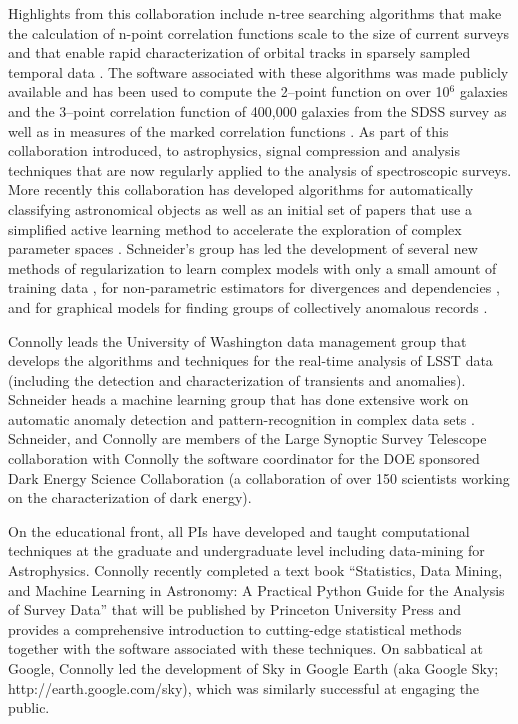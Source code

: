 \documentclass[useAMS,usenatbib,tightenlines,11pt,preprint]{aastex}
\begin{document}
Highlights from this collaboration include n-tree searching algorithms
that make the calculation of n-point correlation functions scale to
the size of current surveys \cite{GrayMoore} and that enable rapid
characterization of orbital tracks in sparsely sampled temporal data
\cite{kubica}. The software associated with these algorithms was made
publicly available and has been used to compute the 2--point function
on over 10$^6$ galaxies and the 3--point correlation function of
400,000 galaxies from the SDSS survey
\cite{Scranton2002,Szapudi2002,Nichol2006,mcbride2011a,mcbride2011b}
as well as in measures of the marked correlation functions
\cite{Skibba2006}.  As part of this collaboration \citet{yip2004a,
  vdp2009, daniel2011} introduced, to astrophysics, signal compression
and analysis techniques that are now regularly applied to the analysis
of spectroscopic surveys. More recently this collaboration has
developed algorithms for automatically classifying astronomical objects
\cite{vdp2009,daniel2011} as well as an initial set of papers that use
a simplified active learning method to accelerate the exploration of
complex parameter spaces \cite{daniel2012}.  Schneider's group has led
the development of several new methods of regularization to learn
complex models with only a small amount of training data
\cite{YiZhangICML2010,YiZhangSDM2010,YiZhangMultitask2010,YiZhang2011multiECOC,YiZhang2012},
for non-parametric estimators for divergences and dependencies
\cite{poczos11alphadiv,Poczos2011UAI,poczos12CVPR}, and for graphical
models for finding groups of collectively anomalous records
\cite{Xiong2011gad,xiong2011fgm}.
 
Connolly leads the University of Washington data management group that
develops the algorithms and techniques for the real-time analysis of
LSST data (including the detection and characterization of
transients and anomalies).  Schneider heads a machine learning group
that has done extensive work on automatic anomaly detection and
pattern-recognition in complex data sets
\cite{Xiong2011gad,poczos12CVPR}.  Schneider, and Connolly are members
of the Large Synoptic Survey Telescope collaboration with Connolly the
software coordinator for the DOE sponsored Dark Energy Science
Collaboration (a collaboration of over 150 scientists working on the
characterization of dark energy).


On the educational front, all PIs have developed and taught computational techniques at the
graduate and undergraduate level including data-mining for
Astrophysics. Connolly recently completed a text book ``Statistics,
Data Mining, and Machine Learning in Astronomy: A Practical Python
Guide for the Analysis of Survey Data'' that will be published by
Princeton University Press and provides a comprehensive introduction
to cutting-edge statistical methods together with the software
associated with these techniques. On sabbatical at Google, Connolly led the
development of Sky in Google Earth (aka Google Sky;
http://earth.google.com/sky), which was similarly successful at
engaging the public.
\end{document}

